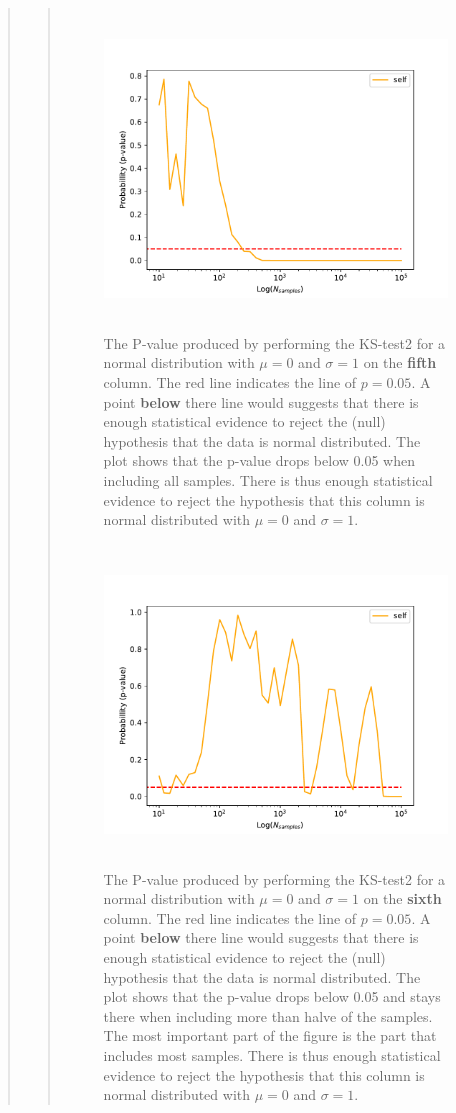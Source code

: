 \begin{quote}
\begin{quote}
\begin{figure}[!ht]
\centering
\includegraphics[width=14cm, height=8.5cm]{./Plots/1e_plot_column_4.pdf}
\caption{The P-value produced by performing the KS-test2 for a normal distribution with $\mu = 0$ and $\sigma = 1$ on the \textbf{fifth} column.  The red line indicates the line of $ p = 0.05$. A point \textbf{below} there  line would suggests that there is enough statistical evidence to reject the (null) hypothesis that the data is normal distributed. The plot shows that the p-value drops below 0.05 when including all samples. There is thus enough statistical evidence to reject the hypothesis that this column is normal distributed with $\mu = 0$ and $\sigma = 1$.}
\end{figure}


\begin{figure}[!ht]
\centering
\includegraphics[width=14cm, height=8.5cm]{./Plots/1e_plot_column_5.pdf}
\caption{The P-value produced by performing the KS-test2 for a normal distribution with $\mu = 0$ and $\sigma = 1$ on the \textbf{sixth} column.  The red line indicates the line of $ p = 0.05$. A point \textbf{below} there  line would suggests that there is enough statistical evidence to reject the (null) hypothesis that the data is normal distributed. The plot shows that the p-value drops below 0.05 and stays there when including more than halve of the samples. The most important part of the figure is the part that includes most samples. There is thus enough statistical evidence to reject the hypothesis that this column is normal distributed with $\mu = 0$ and $\sigma = 1$.}
\end{figure}


\end{quote}
\end{quote}
